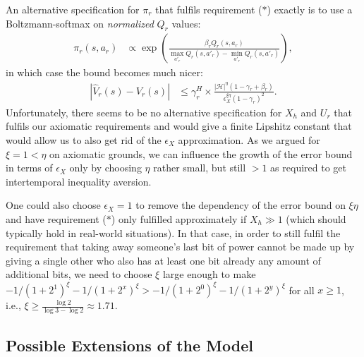 \documentclass[letterpaper]{article} %
\def\H{\mathcal{H}}
\begin{document}
An alternative specification for $\pi_r$ that fulfils requirement ($\ast$) exactly is to use a Boltzmann-softmax on {\em normalized} $Q_r$ values:
\begin{align*}
    \pi_r(s,a_r) &\propto \exp\left(\frac{\beta_r Q_r(s,a_r)}{\max_{a'_r}Q_r(s,a'_r)-\min_{a'_r}Q_r(s,a'_r)}\right),
\end{align*}
in which case the bound becomes much nicer:
\begin{align*}
    |\hat V_r(s) - V_r(s)| 
    &\le \gamma_r^H\times\frac{|\H|^\eta (1-\gamma_r+\beta_r)}{\epsilon_X^{\xi\eta}(1-\gamma_r)^2}.
\end{align*}
Unfortunately, there seems to be no alternative specification for $X_h$ and $U_r$ that fulfils our axiomatic requirements and would give a finite Lipshitz constant that would allow us to also get rid of the $\epsilon_X$ approximation.
As we argued for $\xi=1<\eta$ on axiomatic grounds, we can influence the growth of the error bound in terms of $\epsilon_X$ only by choosing $\eta$ rather small, but still $>1$ as required to get intertemporal inequality aversion.

One could also choose $\epsilon_X=1$ to remove the dependency of the error bound on $\xi\eta$ and have requirement ($\ast$) only fulfilled approximately if $X_h\gg 1$ (which should typically hold in real-world situations). 
In that case, in order to still fulfil the requirement that taking away someone's last bit of power cannot be made up by giving a single other who also has at least one bit already any amount of additional bits, we need to choose $\xi$ large enough to make $-1/(1+2^1)^\xi -1/(1+2^x)^\xi > -1/(1+2^0)^\xi -1/(1+2^y)^\xi$ for all $x\ge 1$,
i.e., $\xi \ge \frac{\log 2}{\log 3-\log 2}\approx 1.71$.


\subsection*{Possible Extensions of the Model}
\end{document}
